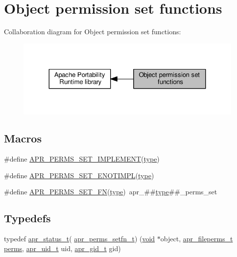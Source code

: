 \hypertarget{group__apr__perms__set}{}\section{Object permission set functions}
\label{group__apr__perms__set}
Collaboration diagram for Object permission set functions\+:
\nopagebreak
\begin{figure}[H]
\begin{center}
\leavevmode
\includegraphics[width=324pt]{group__apr__perms__set}
\end{center}
\end{figure}
\subsection*{Macros}
\begin{DoxyCompactItemize}
\item 
\#define \hyperlink{group__apr__perms__set_ga29704fb2aaa82cd01ceb25fd89c59e5e}{A\+P\+R\+\_\+\+P\+E\+R\+M\+S\+\_\+\+S\+E\+T\+\_\+\+I\+M\+P\+L\+E\+M\+E\+NT}(\hyperlink{pcre_8txt_a2463fbbe8b0c90b90db12195e1edaa5d}{type})
\item 
\#define \hyperlink{group__apr__perms__set_ga1ae74713960ce2e7dd67a156c3dacf60}{A\+P\+R\+\_\+\+P\+E\+R\+M\+S\+\_\+\+S\+E\+T\+\_\+\+E\+N\+O\+T\+I\+M\+PL}(\hyperlink{pcre_8txt_a2463fbbe8b0c90b90db12195e1edaa5d}{type})
\item 
\#define \hyperlink{group__apr__perms__set_ga02ae6e9b09f96632c5dc706bb2194cee}{A\+P\+R\+\_\+\+P\+E\+R\+M\+S\+\_\+\+S\+E\+T\+\_\+\+FN}(\hyperlink{pcre_8txt_a2463fbbe8b0c90b90db12195e1edaa5d}{type})~apr\+\_\+\#\#\hyperlink{pcre_8txt_a2463fbbe8b0c90b90db12195e1edaa5d}{type}\#\#\+\_\+perms\+\_\+set
\end{DoxyCompactItemize}
\subsection*{Typedefs}
\begin{DoxyCompactItemize}
\item 
typedef \hyperlink{group__apr__errno_gaa5105fa83cc322f09382292db8b47593}{apr\+\_\+status\+\_\+t}( \hyperlink{group__apr__perms__set_ga65b3990e3ff0b2e9e3c3ebe417c464be}{apr\+\_\+perms\+\_\+setfn\+\_\+t}) (\hyperlink{group__MOD__ISAPI_gacd6cdbf73df3d9eed42fa493d9b621a6}{void} $\ast$object, \hyperlink{group__apr__file__info_ga3af19c4c47007169064a70f9351bc7d8}{apr\+\_\+fileperms\+\_\+t} \hyperlink{group__APR__Util__DBM__SDBM_ga4644cd2c8097d1b754ec32f7c5ea6d5b}{perms}, \hyperlink{group__apr__user_gad1aa508f584bc230acf4f68ba4fc4de7}{apr\+\_\+uid\+\_\+t} uid, \hyperlink{group__apr__user_ga22e9e224e984f837f3e276833e2f3a55}{apr\+\_\+gid\+\_\+t} gid)
\end{DoxyCompactItemize}


